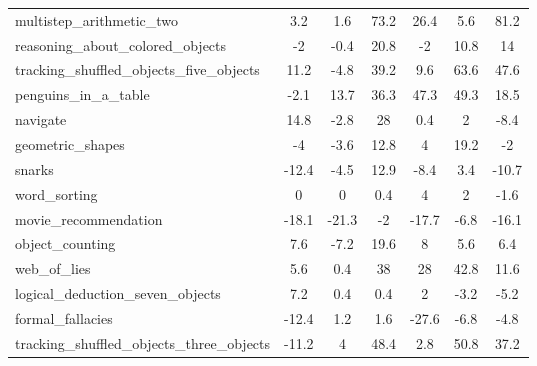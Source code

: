 \documentclass[11pt]{article}
\begin{document}
\begin{table}[htbp]
{\begin{tabular}{l|c|c|c|c|c|c}
multistep\_arithmetic\_two                &               3.2 &          1.6 &                73.2 &                 26.4 &          5.6 &             81.2 \\
reasoning\_about\_colored\_objects         &              -2   &         -0.4 &                20.8 &                 -2   &         10.8 &             14   \\
tracking\_shuffled\_objects\_five\_objects  &              11.2 &         -4.8 &                39.2 &                  9.6 &         63.6 &             47.6 \\
penguins\_in\_a\_table                     &              -2.1 &         13.7 &                36.3 &                 47.3 &         49.3 &             18.5 \\
 navigate                                &              14.8 &         -2.8 &                28   &                  0.4 &          2   &             -8.4 \\
geometric\_shapes                        &              -4   &         -3.6 &                12.8 &                  4   &         19.2 &             -2   \\
snarks                                  &             -12.4 &         -4.5 &                12.9 &                 -8.4 &          3.4 &            -10.7 \\
word\_sorting                            &               0   &          0   &                 0.4 &                  4   &          2   &             -1.6 \\
movie\_recommendation                    &             -18.1 &        -21.3 &                -2   &                -17.7 &         -6.8 &            -16.1 \\
object\_counting                         &               7.6 &         -7.2 &                19.6 &                  8   &          5.6 &              6.4 \\
web\_of\_lies                             &               5.6 &          0.4 &                38   &                 28   &         42.8 &             11.6 \\
logical\_deduction\_seven\_objects         &               7.2 &          0.4 &                 0.4 &                  2   &         -3.2 &             -5.2 \\
formal\_fallacies                        &             -12.4 &          1.2 &                 1.6 &                -27.6 &         -6.8 &             -4.8 \\
tracking\_shuffled\_objects\_three\_objects &             -11.2 &          4   &                48.4 &                  2.8 &         50.8 &             37.2 \\

\end{tabular}}
\end{table}
\end{document}

